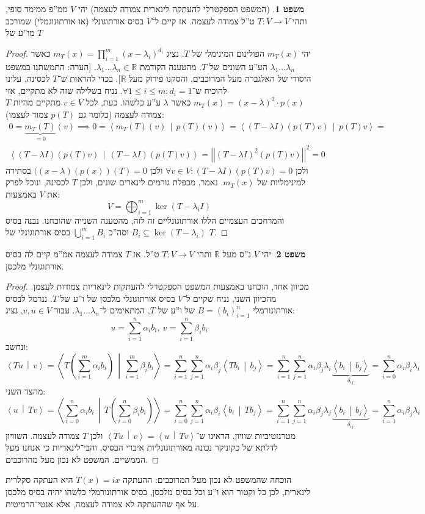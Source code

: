 \documentclass[a4paper]{article}
\newcommand\R     {\mathbb{R}}
\newcommand\ra    {\rangle}
\newcommand\la    {\langle}
\newcommand\sumni     {\sum_{i = 0}^{n}}
\newcommand\co        {\colon}
\newcommand\norm[1]   {\left \vert \left \vert #1 \right \vert \right \vert}
\newcommand\mut [2]   {\left \la #1 \,\middle\vert\, #2 \right \ra}
\newcommand\ag        {\alpha}
\newcommand\bg        {\beta}
\newcommand\dg        {\delta}
\renewcommand\lg      {\lambda}
\newcommand\cl [1]    {\left ( #1 \right )}
\theoremstyle{definition}
\newtheorem{Theorem}{משפט}
\newcommand\theo  [1] {\begin{Theorem}#1\end{Theorem}}
\begin{document}
	\theo{(המשפט הספקטרלי להעתקה לינארית צמודה לעצמה) יהי $V$ ממ''פ ממימד סופי, ותהי $T \co V \to V$ ט''ל צמודה לעצמה. אז קיים ל־$V$ בסיס אורתוגונלי (או אורתונוגמלי) שמורכב מו''ע של $T$} \begin{proof}
		יהי $m_T(x)$ הפולינום המינימלי של $T$. נציג $m_T(x) = \prod_{i = 1}^{m}(x - \lg_i)^{d_i}$ כאשר $\lg_1 \dots \lg_n$ הע''ע השונים של $T$. מהטענה הקודמת $\lg_1 \dots \lg_n \in \R$. [הערה: התמשתנו במשפט היסודי של האלגברה מעל המרוכבים, והסקנו פירוק מעל $\R$]. בכדי להראות ש־$T$ לכסינה, עלינו להוכיח ש־$\forall 1 \le i \le m \co d_i = 1$. נניח בשלילה שזה לא מתקיים, אזי $m_T(x) = (x - \lg)^2 \cdot p(x)$ כאשר $\lg$ ע''ע כלשהו. כעת, לכל $v \in V$ מתקיים מהיות $T$ צמודה לעצמה (כלומר גם $p(T)$ צמוד לעצמו): 
		\begin{multline*}
			0 = \underbrace{m_T(T)}_{=0}(v) \implies 0 = \mut{m_T(T)(v)}{p(T)(v)} = \mut{(T - \lg I)(p(T)v)}{p(T)v} =\\ \mut{(T - \lg I)(p(T)v)}{(T - \lg I)(p(T)v)} = \norm{(T - \lg I)^2(p(T)v)}^2 = 0
		\end{multline*}
		ולכן $\forall v \in V \co (T - \lg I)(p(T)v) = 0$ ולכן $((x - \lg)(p(x))(T) = 0$ בסתירה למינימליות של $m_T(x)$. נאמר, מכפלת גורמים לינארים שונים, ולכן $T$ לכסינה, ונוכל לפרק את $V$ באמצעות: 
		\[ V = \bigoplus_{i = 1}^{m} \ker (T - \lg_i I) \]
		והמרחכים העצמיים הללו אורתוגונליים זה לזה, מהטענה השנייה שהוכחנו. 
		נבנה בסיס $B_i \subseteq \ker (T - \lg_i)$ וסה''כ $\bigcup_{i = 1}^{m} B_i$ בסיס אורתוגונלי של $T$. 
	\end{proof}
	\theo{יהי $V$ נ''ס מעל $\R$ ותהי $T \co V \to V$ ט''ל. אז $T$ צמודה לעצמה אמ''מ קיים לה בסיס אורתוגונלי מלכסן. }\begin{proof}
		מכיוון אחד, הוכחנו באמצעות המשפט הספקטרלי להעתקות לינאריות צמודות לעצמן. 
		מהכיוון השני, נניח שקיים ל־$V$ בסיס אורתוגונלי מלכסן של ו''ע של $T$. ננרמל לבסיס אורתונורמלי $B = (b_i)_{i = 1}^{n}$ של ו''ע של $T$, המתאימים ל־$\lg_1 \dots \lg_n$. עבור $v, u \in V$, נציג: 
		\[ u = \sum_{i = 1}^{n}\ag_i b_i, \ v = \sum_{i = 1}^{n}\bg_i b_i \]
		ונחשב: 
		\[ \mut{Tu}{v} = \mut{T\cl{\sum_{i = 1}^{m}\ag_i b_i}}{\sum_{i = 1}^{m}\bg_i b_i} = \sum_{i = 1}^{n}\sum_{j = 1}^{n}\ag_i \bg_j \mut{T b_i}{b_j} = \sum_{i = 1}^{n}\sum_{j = 1}^{n}\ag_i \bg_j \lg_i \underbrace{\mut{b_i}{b_j}}_{\dg_{ij}} = \sumni \ag_i \bg_i \lg_i \]
		מהצד השני: 
		\[ \mut{u}{Tv} = \mut{\sumni \ag_i b_i}{T\cl{\sumni \bg_i b_i}} = \sumni \sum_{j = 1}^{n}\ag_i \bg_i \mut{b_i}{Tb_j} = \sum_{i = 1}^{n}\sum_{j = 1}^{n}\ag_i \bg_j \lg_j \underbrace{\mut{b_i}{b_j}}_{\dg_{ij}} = \sum_{i = 1}^{n}\ag_i \bg_j \lg_i \]
		מטרנזטיביות שוויון, הראינו ש־$\mut{Tu}{v} = \mut{u}{Tv}$ ולכן $T$ צמודה לעצמה. השוויון לדלתא של כקוניקר נכונה מאורתוגונליות איברי הבסיס, והבי־לינאריות כי אנחנו מעל הממשיים. המשפט לא נכון מעל מהרוכבים. 
	\end{proof}
	הוכחה שהמשפט לא נכון מעל המרוכבים: ההעתקה $T(x) = ix$ היא העתקה סקלרית לינארית, לכן כל וקטור הוא ו''ע וכל בסיס מלכסן, בסיס אורתונורמלי כלשהו יהיה בסיס מלכסן על אף שההעתקה לא צמודה לעצמה, אלא אנטי־הרמיטית. 
	
\end{document}

